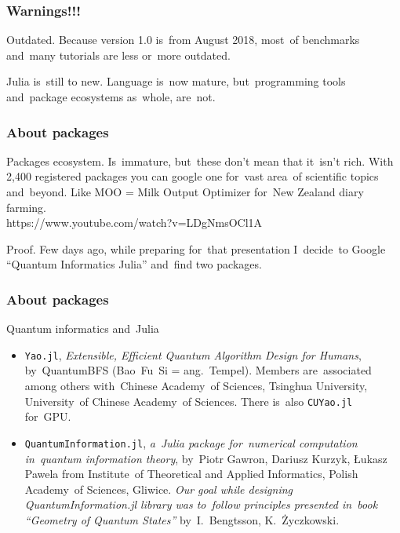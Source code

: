 \documentclass[10pt,t]{beamer}
\begin{document}
\begin{frame}
  \frametitle{Warnings!!!}


  Outdated. Because version 1.0 is~from August 2018, most~of benchmarks
  and~many tutorials are less or~more outdated.

  Julia is~still to new. Language is~now mature, but~programming tools
  and~package ecosystems as~whole, are~not.

\end{frame}





\begin{frame}
  \frametitle{About packages}


  Packages ecosystem.
  Is~immature, but~these don't mean that it~isn't rich. With 2,400
  registered packages you can google one for~vast area~of scientific
  topics and~beyond. Like MOO = Milk Output Optimizer for~New
  Zealand diary farming. \\
  {https://www.youtube.com/watch?v=LDgNmsOCl1A}

  Proof. Few days ago, while preparing for~that presentation I~decide~to
  Google ``Quantum Informatics Julia'' and~find two packages.

\end{frame}





\begin{frame}
  \frametitle{About packages}


  Quantum informatics and~Julia
  \begin{itemize}
    \RaggedRight

  \item \texttt{Yao.jl}, \textit{Extensible, Efficient Quantum
      Algorithm Design for Humans}, by~QuantumBFS (Bao~Fu~Si =
    ang.~Tempel). Members are~associated among others with~Chinese
    Academy~of Sciences, Tsinghua University, University~of Chinese
    Academy~of Sciences. There is~also \texttt{CUYao.jl} for~GPU.

  \item \texttt{QuantumInformation.jl}, \textit{a~Julia package
      for~numerical computation in~quantum information theory},
    by~Piotr Gawron, Dariusz Kurzyk, Łukasz Pawela from Institute~of
    Theoretical and Applied Informatics, Polish Academy~of Sciences,
    Gliwice. \textit{Our goal while designing QuantumInformation.jl
      library was to~follow principles presented in~book ``Geometry
      of Quantum States''} by~I.~Bengtsson, K.~Życzkowski.

  \end{itemize}

\end{frame}
\end{document}
